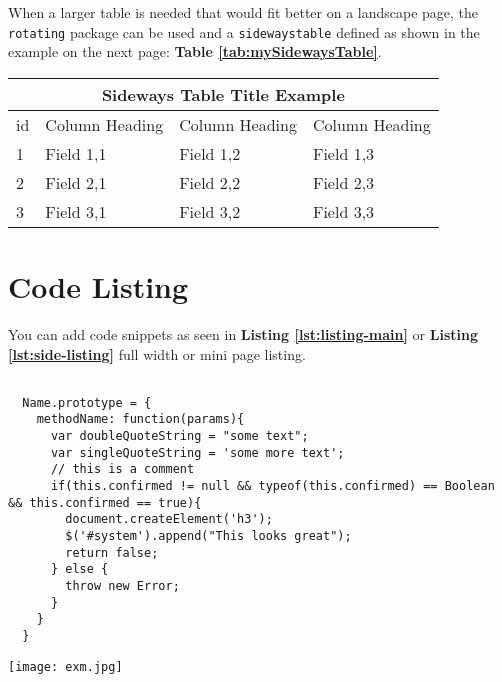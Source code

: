 When a larger table is needed that would fit better on a landscape page, the \texttt{rotating} package can be used and a \texttt{sidewaystable} defined as shown in the example on the next page: \textbf{Table \ref{tab:mySidewaysTable}}.

\begin{sidewaystable}
  \begin{tabular}{ |p{0.5cm}|p{7cm}|p{7cm}|p{7cm}|  }
    \hline
        \multicolumn{4}{|c|}{Sideways Table Title Example} \\
     \hline
        \multicolumn{1}{|c|}{id} &
        \multicolumn{1}{|c|}{Column Heading} &
        \multicolumn{1}{|c|}{Column Heading} &
        \multicolumn{1}{|c|}{Column Heading}  \\
     \hline
        1 & Field 1,1 & Field 1,2 & Field 1,3 \\
     \hline
        2 & Field 2,1 & Field 2,2 & Field 2,3 \\
     \hline
        3 & Field 3,1 & Field 3,2 & Field 3,3 \\
     \hline

  \end{tabular}
  \label{tab:mySidewaysTable}
\end{sidewaystable}


\section{Code Listing}
\label{sec:code-listing}

You can add code snippets as seen in \textbf{Listing \ref{lst:listing-main}} or \textbf{Listing \ref{lst:side-listing}} full width or mini page listing.

\begin{minipage}{.5\textwidth}
  \begin{listing}[H]
  \begin{verbatim}

  Name.prototype = {
    methodName: function(params){
      var doubleQuoteString = "some text";
      var singleQuoteString = 'some more text';
      // this is a comment
      if(this.confirmed != null && typeof(this.confirmed) == Boolean && this.confirmed == true){
        document.createElement('h3');
        $('#system').append("This looks great");
        return false;
      } else {
        throw new Error;
      }
    }
  }

  \end{verbatim}
  \label{lst:label-for-listing}
  \end{listing}
\end{minipage}%
\begin{minipage}{0.5\textwidth}
	\centering
	\texttt{[image: exm.jpg]}
	\caption{Right side image}
	\label{fig:right-side-minipage}
\end{minipage}

